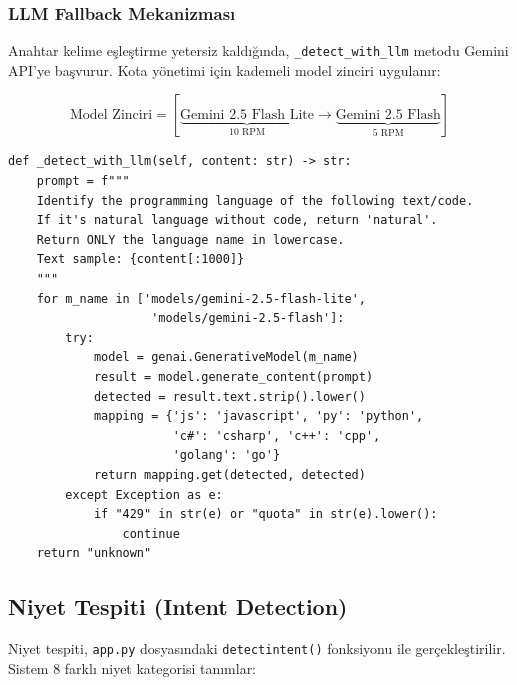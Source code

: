 \documentclass[12pt,a4paper]{article}
\begin{document}
\subsubsection{LLM Fallback Mekanizması}

Anahtar kelime eşleştirme yetersiz kaldığında, \texttt{\_detect\_with\_llm} metodu Gemini API'ye başvurur. Kota yönetimi için kademeli model zinciri uygulanır:

\begin{equation}
    \text{Model Zinciri} = [\underbrace{\text{Gemini 2.5 Flash Lite}}_{\text{10 RPM}} \rightarrow \underbrace{\text{Gemini 2.5 Flash}}_{\text{5 RPM}}]
\end{equation}

\begin{lstlisting}[style=pythonstyle, caption={LLM Tabanlı Dil Algılama (language-detector.py)}, label=lst:llm-detect]
def _detect_with_llm(self, content: str) -> str:
    prompt = f"""
    Identify the programming language of the following text/code.
    If it's natural language without code, return 'natural'.
    Return ONLY the language name in lowercase.
    Text sample: {content[:1000]}
    """
    for m_name in ['models/gemini-2.5-flash-lite', 
                    'models/gemini-2.5-flash']:
        try:
            model = genai.GenerativeModel(m_name)
            result = model.generate_content(prompt)
            detected = result.text.strip().lower()
            mapping = {'js': 'javascript', 'py': 'python',
                       'c#': 'csharp', 'c++': 'cpp',
                       'golang': 'go'}
            return mapping.get(detected, detected)
        except Exception as e:
            if "429" in str(e) or "quota" in str(e).lower():
                continue
    return "unknown"
\end{lstlisting}

\subsection{Niyet Tespiti (Intent Detection)}
\label{subsec:intent}

Niyet tespiti, \texttt{app.py} dosyasındaki \texttt{detect\textunderscore intent()} fonksiyonu ile gerçekleştirilir. Sistem 8 farklı niyet kategorisi tanımlar:
\end{document}
